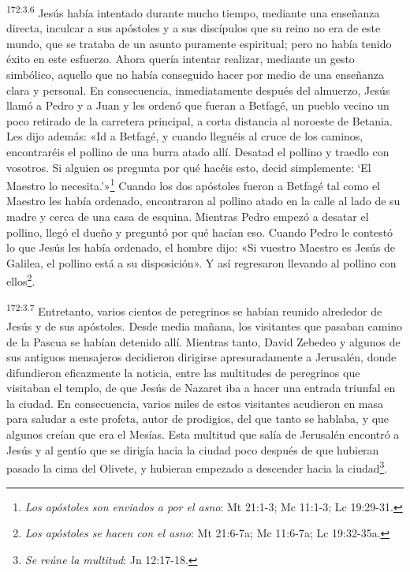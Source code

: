 \par 
\textsuperscript{172:3.6} Jesús había intentado durante mucho tiempo, mediante una enseñanza directa, inculcar a sus apóstoles y a sus discípulos que su reino no era de este mundo, que se trataba de un asunto puramente espiritual; pero no había tenido éxito en este esfuerzo. Ahora quería intentar realizar, mediante un gesto simbólico, aquello que no había conseguido hacer por medio de una enseñanza clara y personal. En consecuencia, inmediatamente después del almuerzo, Jesús llamó a Pedro y a Juan y les ordenó que fueran a Betfagé, un pueblo vecino un poco retirado de la carretera principal, a corta distancia al noroeste de Betania. Les dijo además: «Id a Betfagé, y cuando lleguéis al cruce de los caminos, encontraréis el pollino de una burra atado allí. Desatad el pollino y traedlo con vosotros. Si alguien os pregunta por qué hacéis esto, decid simplemente: `El Maestro lo necesita.'»\footnote{\textit{Los apóstoles son enviados a por el asno}: Mt 21:1-3; Mc 11:1-3; Lc 19:29-31.} Cuando los dos apóstoles fueron a Betfagé tal como el Maestro les había ordenado, encontraron al pollino atado en la calle al lado de su madre y cerca de una casa de esquina. Mientras Pedro empezó a desatar el pollino, llegó el dueño y preguntó por qué hacían eso. Cuando Pedro le contestó lo que Jesús les había ordenado, el hombre dijo: «Si vuestro Maestro es Jesús de Galilea, el pollino está a su disposición». Y así regresaron llevando al pollino con ellos\footnote{\textit{Los apóstoles se hacen con el asno}: Mt 21:6-7a; Mc 11:6-7a; Lc 19:32-35a.}.

\par 
\textsuperscript{172:3.7} Entretanto, varios cientos de peregrinos se habían reunido alrededor de Jesús y de sus apóstoles. Desde media mañana, los visitantes que pasaban camino de la Pascua se habían detenido allí. Mientras tanto, David Zebedeo y algunos de sus antiguos mensajeros decidieron dirigirse apresuradamente a Jerusalén, donde difundieron eficazmente la noticia, entre las multitudes de peregrinos que visitaban el templo, de que Jesús de Nazaret iba a hacer una entrada triunfal en la ciudad. En consecuencia, varios miles de estos visitantes acudieron en masa para saludar a este profeta, autor de prodigios, del que tanto se hablaba, y que algunos creían que era el Mesías. Esta multitud que salía de Jerusalén encontró a Jesús y al gentío que se dirigía hacia la ciudad poco después de que hubieran pasado la cima del Olivete, y hubieran empezado a descender hacia la ciudad\footnote{\textit{Se reúne la multitud}: Jn 12:17-18.}.

